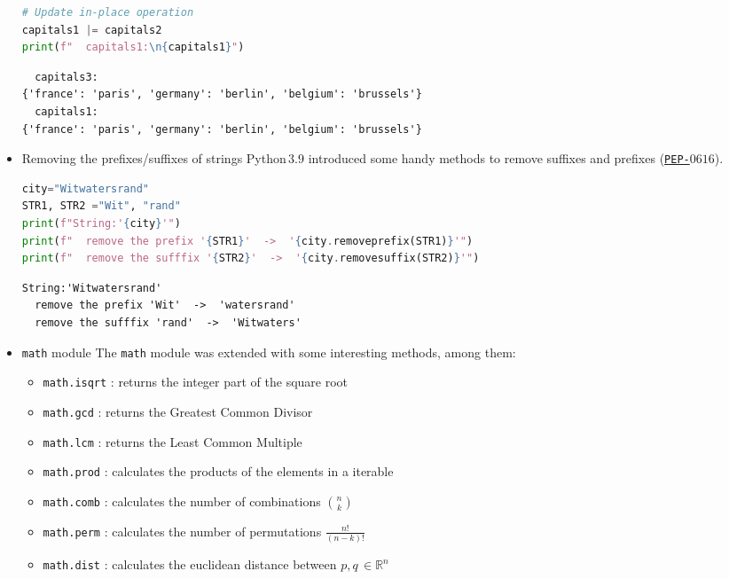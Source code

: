 \documentclass[10pt]{article}
\begin{document}
\begin{itemize}
\begin{lstlisting}[language=python]
# Update in-place operation
capitals1 |= capitals2
print(f"  capitals1:\n{capitals1}")
\end{lstlisting}

\begin{verbatim}
  capitals3:
{'france': 'paris', 'germany': 'berlin', 'belgium': 'brussels'}
  capitals1:
{'france': 'paris', 'germany': 'berlin', 'belgium': 'brussels'}
\end{verbatim}

\item Removing the prefixes/suffixes of strings\newline
Python\,$3.9$ introduced some handy methods to remove suffixes and prefixes 
(\href{https://peps.python.org/pep-0616/}{\texttt{PEP-}$0616$}).
\begin{lstlisting}[language=python]
city="Witwatersrand"
STR1, STR2 ="Wit", "rand"
print(f"String:'{city}'")
print(f"  remove the prefix '{STR1}'  ->  '{city.removeprefix(STR1)}'")
print(f"  remove the sufffix '{STR2}'  ->  '{city.removesuffix(STR2)}'")
\end{lstlisting}

\begin{verbatim}
String:'Witwatersrand'
  remove the prefix 'Wit'  ->  'watersrand'
  remove the sufffix 'rand'  ->  'Witwaters'
\end{verbatim}

\item \lstinline[language=python]{math} module \newline
The \lstinline[language=python]{math} module was extended with
some interesting methods, among them:
\begin{itemize}
\item \lstinline[language=python]{math.isqrt} : returns the integer part of the square root
\item \lstinline[language=python]{math.gcd}   : returns the Greatest Common Divisor
\item \lstinline[language=python]{math.lcm}   : returns the Least Common Multiple
\item \lstinline[language=python]{math.prod}  : calculates the products of the elements in a iterable
\item \lstinline[language=python]{math.comb}  : calculates the number of combinations $n \choose k$
\item \lstinline[language=python]{math.perm}  : calculates the number of permutations $\frac{n!}{(n-k)!}$
\item \lstinline[language=python]{math.dist}  : calculates the euclidean distance between $p,q \,\in \mathbb{R}^n$
\end{itemize}		


\end{itemize}
\end{document}
